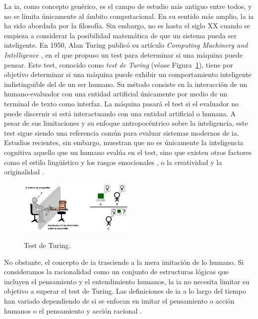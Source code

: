 La \gls{ia}, como concepto genérico, es el campo de estudio más antiguo entre todos, y no se limita únicamente al ámbito computacional. En su sentido más amplio, la \gls{ia} ha sido abordada por la filosofía. 
Sin embargo, no es hasta el siglo XX cuando se empieza a considerar la posibilidad matemática de que un sistema pueda ser inteligente. En 1950, Alan Turing publicó su artículo \emph{Computing Machinery and Intelligence} \citep{alan1950a}, en el que propuso un test para determinar si una máquina puede pensar. Este test, conocido como \emph{test de Turing} (véase Figura~\ref{fig:test_turing}), tiene por objetivo determinar si una máquina puede exhibir un comportamiento inteligente indistinguible del de un ser humano. Su método consiste en la interacción de un humano-evaluador con una entidad artificial únicamente por medio de un terminal de texto como interfaz. La máquina pasará el test si el evaluador no puede discernir si está interactuando con una entidad artificial o humana. A pesar de sus limitaciones y su enfoque antropocéntrico sobre la inteligencia, este test sigue siendo una referencia común para evaluar sistemas modernos de \gls{ia}. Estudios recientes, sin embargo, muestran que no es únicamente la inteligencia cognitiva aquello que un humano evalúa en el test, sino que existen otros factores como el estilo lingüístico y los rasgos emocionales \citep{jonesDoesGPT4Pass2023}, o la creatividad y la originalidad \citep{noeverTuringDeception2022}.

\begin{figure}[H]
    \caption[Test de Turing]{Test de Turing.}
    \centering
    \includegraphics[width=0.5\textwidth]{./figuras/test_turing.png}
    \label{fig:test_turing}
\end{figure}

No obstante, el concepto de \gls{ia} trasciende a la mera imitación de lo humano. Si consideramos la racionalidad como un conjunto de estructuras lógicas que incluyen el pensamiento y el entendimiento humanos, la \gls{ia} no necesita limitar su objetivo a superar el test de Turing. Las definiciones de \gls{ia} a lo largo del tiempo han variado dependiendo de si se enfocan en imitar el pensamiento o acción humanos o el pensamiento y acción racional \citep{RussellStuartJ2021AI:A}.

